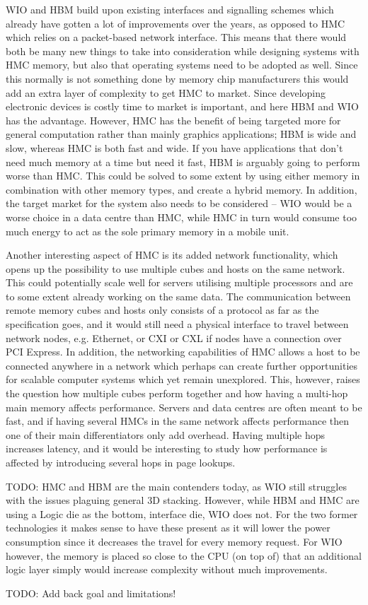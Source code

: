 WIO and HBM build upon existing interfaces and signalling schemes which already have gotten a lot of improvements over the years, as opposed to HMC which relies on a packet-based network interface. This means that there would both be many new things to take into consideration while designing systems with HMC memory, but also that operating systems need to be adopted as well. Since this normally is not something done by memory chip manufacturers this would add an extra layer of complexity to get HMC to market. Since developing electronic devices is costly time to market is important, and here HBM and WIO has the advantage. However, HMC has the benefit of being targeted more for general computation rather than mainly graphics applications; HBM is wide and slow, whereas HMC is both fast and wide. If you have applications that don't need much memory at a time but need it fast, HBM is arguably going to perform worse than HMC. This could be solved to some extent by using either memory in combination with other memory types, and create a hybrid memory. In addition, the target market for the system also needs to be considered -- WIO would be a worse choice in a data centre than HMC, while HMC in turn would consume too much energy to act as the sole primary memory in a mobile unit.
\bigskip

Another interesting aspect of HMC is its added network functionality, which opens up the possibility to use multiple cubes and hosts on the same network. This could potentially scale well for servers utilising multiple processors and are to some extent already working on the same data. The communication between remote memory cubes and hosts only consists of a protocol as far as the specification goes, and it would still need a physical interface to travel between network nodes, e.g. Ethernet, or CXI or CXL if nodes have a connection over PCI Express. In addition, the networking capabilities of HMC allows a host to be connected anywhere in a network which perhaps can create further opportunities for scalable computer systems which yet remain unexplored. This, however, raises the question how multiple cubes perform together and how having a multi-hop main memory affects performance. Servers and data centres are often meant to be fast, and if having several HMCs in the same network affects performance then one of their main differentiators only add overhead. Having multiple hops increases latency, and it would be interesting to study how performance is affected by introducing several hops in page lookups.
\bigskip

TODO: HMC and HBM are the main contenders today, as WIO still struggles with the issues plaguing general 3D stacking. However, while HBM and HMC are using a Logic die as the bottom, interface die, WIO does not. For the two former technologies it makes sense to have these present as it will lower the power consumption since it decreases the travel for every memory request. For WIO however, the memory is placed so close to the CPU (on top of) that an additional logic layer simply would increase complexity without much improvements.

TODO: Add back goal and limitations!